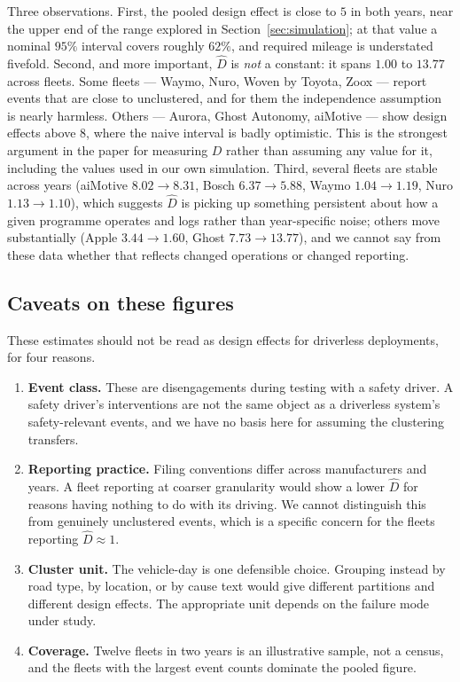 \documentclass[11pt]{article}
\begin{document}
Three observations. First, the pooled design effect is close to $5$ in both
years, near the upper end of the range explored in
Section~\ref{sec:simulation}; at that value a nominal $95\%$ interval covers
roughly $62\%$, and required mileage is understated fivefold. Second, and more
important, $\hat{D}$ is \emph{not} a constant: it spans $1.00$ to $13.77$ across
fleets. Some fleets --- Waymo, Nuro, Woven by Toyota, Zoox --- report events that
are close to unclustered, and for them the independence assumption is nearly
harmless. Others --- Aurora, Ghost Autonomy, aiMotive --- show design effects
above $8$, where the naive interval is badly optimistic. This is the strongest
argument in the paper for measuring $D$ rather than assuming any value for it,
including the values used in our own simulation. Third, several fleets are stable
across years (aiMotive $8.02 \to 8.31$, Bosch $6.37 \to 5.88$, Waymo
$1.04 \to 1.19$, Nuro $1.13 \to 1.10$), which suggests $\hat{D}$ is picking up
something persistent about how a given programme operates and logs rather than
year-specific noise; others move substantially (Apple $3.44 \to 1.60$, Ghost
$7.73 \to 13.77$), and we cannot say from these data whether that reflects
changed operations or changed reporting.

\subsection{Caveats on these figures}

These estimates should not be read as design effects for driverless deployments,
for four reasons.

\begin{enumerate}
\item \textbf{Event class.} These are disengagements during testing with a safety
driver. A safety driver's interventions are not the same object as a driverless
system's safety-relevant events, and we have no basis here for assuming the
clustering transfers.
\item \textbf{Reporting practice.} Filing conventions differ across
manufacturers and years. A fleet reporting at coarser granularity would show a
lower $\hat{D}$ for reasons having nothing to do with its driving. We cannot
distinguish this from genuinely unclustered events, which is a specific concern
for the fleets reporting $\hat{D} \approx 1$.
\item \textbf{Cluster unit.} The vehicle-day is one defensible choice. Grouping
instead by road type, by location, or by cause text would give different
partitions and different design effects. The appropriate unit depends on the
failure mode under study.
\item \textbf{Coverage.} Twelve fleets in two years is an illustrative sample,
not a census, and the fleets with the largest event counts dominate the pooled
figure.
\end{enumerate}
\end{document}
